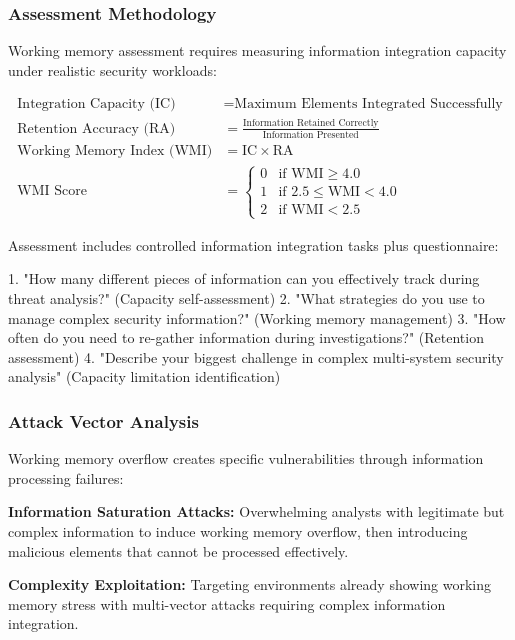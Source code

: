 \documentclass[11pt,a4paper]{article}
\begin{document}
\subsubsection{Assessment Methodology}

Working memory assessment requires measuring information integration capacity under realistic security workloads:

\begin{align}
\text{Integration Capacity (IC)} &= \text{Maximum Elements Integrated Successfully} \\
\text{Retention Accuracy (RA)} &= \frac{\text{Information Retained Correctly}}{\text{Information Presented}} \\
\text{Working Memory Index (WMI)} &= \text{IC} \times \text{RA} \\
\text{WMI Score} &= \begin{cases}
0 & \text{if WMI} \geq 4.0 \\
1 & \text{if } 2.5 \leq \text{WMI} < 4.0 \\
2 & \text{if WMI} < 2.5
\end{cases}
\end{align}

Assessment includes controlled information integration tasks plus questionnaire:

1. "How many different pieces of information can you effectively track during threat analysis?" (Capacity self-assessment)
2. "What strategies do you use to manage complex security information?" (Working memory management)
3. "How often do you need to re-gather information during investigations?" (Retention assessment)
4. "Describe your biggest challenge in complex multi-system security analysis" (Capacity limitation identification)

\subsubsection{Attack Vector Analysis}

Working memory overflow creates specific vulnerabilities through information processing failures:

\textbf{Information Saturation Attacks:} Overwhelming analysts with legitimate but complex information to induce working memory overflow, then introducing malicious elements that cannot be processed effectively.

\textbf{Complexity Exploitation:} Targeting environments already showing working memory stress with multi-vector attacks requiring complex information integration.
\end{document}
